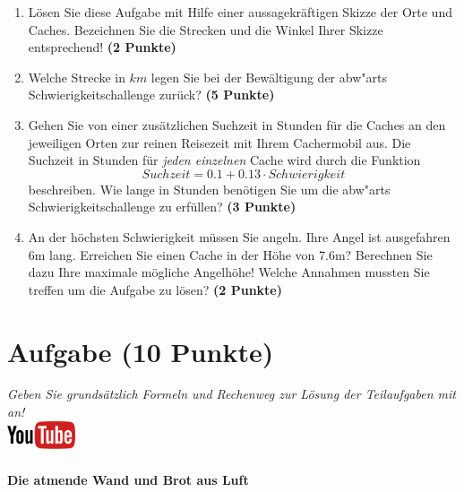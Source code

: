 \documentclass[a4paper, 9pt]{scrartcl}\usepackage[]{graphicx}\usepackage[]{xcolor}
\begin{document}
\begin{enumerate}
\item L{\"o}sen Sie diese Aufgabe mit Hilfe einer aussagekr{\"a}ftigen Skizze der
  Orte und Caches. Bezeichnen Sie die Strecken und die Winkel Ihrer Skizze
  entsprechend! \textbf{(2 Punkte)}
\item Welche Strecke in $km$ legen Sie bei der Bew{\"a}ltigung der
  abw{"a}rts Schwierigkeitschallenge zur{\"u}ck? \textbf{(5
    Punkte)}
\item Gehen Sie von einer zus{\"a}tzlichen Suchzeit in Stunden f{\"u}r die
  Caches an den jeweiligen Orten zur reinen Reisezeit mit Ihrem Cachermobil
  aus. Die Suchzeit in Stunden f{\"u}r \textit{jeden einzelnen} Cache wird durch die
  Funktion
  \begin{equation*}
    Suchzeit = 0.1 + 0.13 \cdot Schwierigkeit
  \end{equation*}  
  beschreiben.  Wie lange in Stunden ben{\"o}tigen Sie um die
  abw{"a}rts Schwierigkeitschallenge zu erf{\"u}llen? \textbf{(3 Punkte)}
\item An der h{\"o}chsten Schwierigkeit m{\"u}ssen Sie angeln. Ihre Angel ist
  ausgefahren 6m lang. Erreichen Sie einen Cache in der H{\"o}he
  von 7.6m?  Berechnen Sie dazu Ihre maximale m{\"o}gliche
  Angelh{\"o}he! Welche Annahmen mussten Sie treffen um die Aufgabe zu l{\"o}sen? \textbf{(2 Punkte)} 
\end{enumerate}

 
\clearpage

\section{Aufgabe \hfill (10 Punkte)}

\textit{Geben Sie grunds{\"a}tzlich Formeln und Rechenweg zur L{\"o}sung der
  Teilaufgaben mit an!} \\[1Ex]

\hfill\href{https://youtu.be/4-dSaPMhK9s}{\includegraphics[width =
  2cm]{img/youtube}} %
\hspace{2Ex}

\paragraph{Die atmende Wand und Brot aus Luft}
\end{document}
